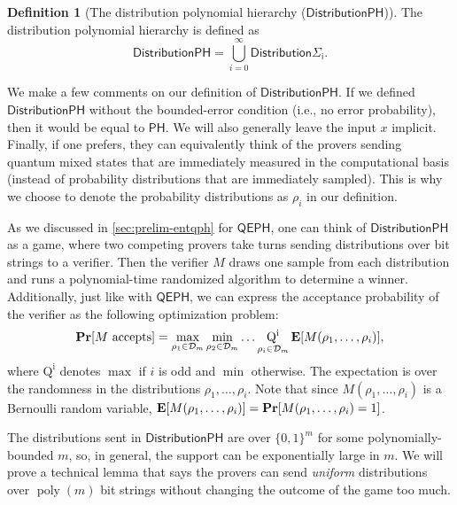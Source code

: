 \documentclass[11pt]{article}
\theoremstyle{definition}
\newtheorem{definition}[theorem]{Definition}
\renewcommand{\Pr}{\mathop{\bf Pr\/}}
\newcommand{\E}{\mathop{\bf E\/}}
\DeclareMathOperator{\poly}{poly}
\newcommand{\class}[1]{\ensuremath{\mathsf{#1}}\xspace}
\newcommand{\PH}{\class{PH}}
\newcommand{\QEPH}{\class{QEPH}}
\newcommand{\distributionPH}{\mixedPH}
\newcommand{\mixedPH}{\class{DistributionPH}}
\newcommand{\mixedSigmai}[1][i]{\mathsf{Distribution\Sigma_{#1}}}
\newcommand{\calD}{\mathcal{D}}
\begin{document}
\begin{definition}[The distribution polynomial hierarchy ($\distributionPH$)]\label{def:mixedPH}
    The distribution polynomial hierarchy is defined as 
    \[\mixedPH = \bigcup_{i = 0}^{\infty} \mixedSigmai[i].\]
\end{definition}


We make a few comments on our definition of $\distributionPH$.
If we defined $\mixedPH$ without the bounded-error condition (i.e., no error probability), then it would be equal to $\PH$. We will also generally leave the input $x$ implicit.
Finally, if one prefers, they can equivalently think of the provers sending quantum mixed states that are immediately measured in the computational basis (instead of probability distributions that are immediately sampled). This is why we choose to denote the probability distributions as $\rho_i$ in our definition. 

As we discussed in \cref{sec:prelim-entqph} for $\QEPH$, one can think of $\mixedPH$ as a game, where two competing provers take turns sending distributions over bit strings to a verifier. Then the verifier $M$ draws one sample from each distribution and runs a polynomial-time randomized algorithm to determine a winner.
Additionally, just like with $\QEPH$, we can express the acceptance probability of the verifier as the following optimization problem:
\[
\Pr[M \text{ accepts}] = \max_{\rho_1 \in \calD_m} \min_{\rho_2 \in \calD_m} \ldots \operatorname*{Q^i}_{\rho_i \in \calD_m} \E[M(\rho_1, \ldots, \rho_i)],
\]
where
$\operatorname*{Q^i}$ denotes $\max$ if $i$ is odd and $\min$ otherwise. 
The expectation is over the randomness in the distributions $\rho_1, \ldots, \rho_i$. Note that since $M(\rho_1, \ldots, \rho_i)$ is a Bernoulli random variable, $\E[M(\rho_1, \ldots, \rho_i)] = \Pr[M(\rho_1, \ldots, \rho_i) = 1]$.

The distributions sent in $\mixedPH$ are over $\{0,1\}^m$ for some polynomially-bounded $m$, so, in general, the support can be exponentially large in $m$. 
We will prove a technical lemma that says the provers can send \emph{uniform} distributions over $\poly(m)$ bit strings without changing the outcome of the game too much. 
\end{document}
